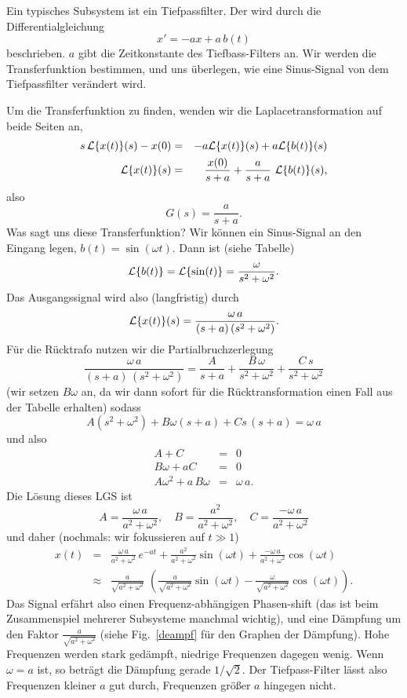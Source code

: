 \begin{bspX}
Ein typisches Subsystem ist ein Tiefpassfilter. Der wird durch die Differentialgleichung 
$$x' = - a x + a\,b(t)$$
beschrieben. $a$ gibt die Zeitkonstante des Tiefbass-Filters an. 
Wir werden die Transferfunktion bestimmen, und uns \"uberlegen, wie 
eine Sinus-Signal von dem Tiefpassfilter ver\"andert wird.\par\medskip

Um die Transferfunktion zu finden, wenden wir die 
Laplacetransformation auf beide Seiten an,
\begin{eqnarray*}
s\, {\cal L}\{x(t)\}(s) - x(0) &=& - a {\cal L}\{x(t)\}(s) +a {\cal L}\{b(t)\}(s) \\
{\cal L}\{x(t)\}(s) &=& \frac{x(0)}{s+a} +  \frac{a}{s+a}\,\,{\cal L}\{b(t)\}(s),
\end{eqnarray*}
also
$$ G(s) = \frac a {s+a}.$$
Was sagt uns diese Transferfunktion? Wir k\"onnen ein Sinus-Signal an den Eingang 
legen, $b(t)=\sin(\omega t)$. Dann ist (siehe Tabelle) 
$$ {\cal L}\{b(t)\} ={\cal L}\{\sin(t)\} = \frac{\omega}{s^2+\omega^2}.$$
Das Ausgangssignal wird also (langfristig) durch 
$${\cal L}\{x(t)\}(s) 
=  \frac{\omega\, a}{(s+a)\,(s^2+\omega^2)}.$$
F\"ur die R\"ucktrafo nutzen wir die Partialbruchzerlegung
$$
\frac{\omega\,a}{(s+a)\,(s^2+\omega^2)}
=
\frac A {s+a} + \frac {B\,\omega} {s^2+\omega^2} + \frac {C\, s} {s^2+\omega^2} 
$$
(wir setzen $B\omega$ an, da wir dann sofort 
f\"ur die R\"ucktransformation einen Fall aus der Tabelle erhalten) 
sodass
$$ A(s^2+\omega^2) + B \omega(s+a)+ C s\,(s+a) = \omega\, a$$
und also 
\begin{eqnarray*}
A+C &=& 0\\
B\omega + a C &=& 0\\
A\omega^2 + a\, B\omega &=& \omega\, a.
\end{eqnarray*}
Die L\"osung dieses LGS ist 
$$ A = \frac{\omega\, a}{a^2+\omega^2},\quad B = \frac{a^2}{a^2+\omega^2},\quad C = \frac{-\omega\, a}{a^2+\omega^2}$$
und daher (nochmals: wir fokussieren auf $t\gg 1$)
\begin{eqnarray*}
x(t) &=& 
 \frac{\omega\, a}{a^2+\omega^2}\, e^{-a t}
 + \frac{a^2}{a^2+\omega^2} \sin(\omega t)
 + \frac{-\omega\, a}{a^2+\omega^2} \cos(\omega t)\\
 &\approx& \frac {a}{\sqrt{a^2+\omega^2}}\,\,\left(
 \frac{a}{\sqrt{a^2+\omega^2}} \sin(\omega t)
 - \frac{\omega}{\sqrt{a^2+\omega^2}} \cos(\omega t)\right).
\end{eqnarray*}
 Das Signal erf\"ahrt also einen Frequenz-abh\"angigen Phasen-shift 
 (das ist beim Zusammenspiel 
 mehrerer Subsysteme manchmal wichtig), und eine D\"ampfung um den Faktor 
 $\frac {a}{\sqrt{a^2+\omega^2}}$ (siehe Fig.~\ref{deampf} f\"ur den Graphen 
 der D\"ampfung). Hohe Frequenzen werden
 stark ged\"ampft, niedrige Frequenzen dagegen wenig.  Wenn $\omega=a$ ist, 
 so betr\"agt die D\"ampfung gerade $1/\sqrt{2}$. Der Tiefpass-Filter l\"asst 
 also Frequenzen kleiner $a$ gut durch, Frequenzen gr\"o\ss{}er $a$ hingegen nicht.
 \end{bspX}
 
